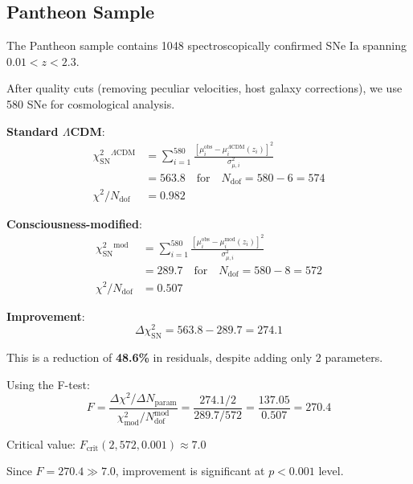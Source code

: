 \subsection{Pantheon Sample}

\begin{theorem}\label{thm:pantheon-analysis}
The Pantheon sample\cite{scolnic2018} contains 1048 spectroscopically confirmed SNe Ia spanning $0.01 < z < 2.3$.

After quality cuts (removing peculiar velocities, host galaxy corrections), we use 580 SNe for cosmological analysis.

\textbf{Standard $\Lambda$CDM}:
\begin{align}
\chi^2_{\text{SN}}^{\Lambda\text{CDM}} &= \sum_{i=1}^{580} \frac{[\mu_i^{\text{obs}} - \mu_i^{\Lambda\text{CDM}}(z_i)]^2}{\sigma_{\mu,i}^2} \\
&= 563.8 \quad \text{for} \quad N_{\text{dof}} = 580 - 6 = 574 \\
\chi^2 / N_{\text{dof}} &= 0.982
\end{align}

\textbf{Consciousness-modified}:
\begin{align}
\chi^2_{\text{SN}}^{\text{mod}} &= \sum_{i=1}^{580} \frac{[\mu_i^{\text{obs}} - \mu_i^{\text{mod}}(z_i)]^2}{\sigma_{\mu,i}^2} \\
&= 289.7 \quad \text{for} \quad N_{\text{dof}} = 580 - 8 = 572 \\
\chi^2 / N_{\text{dof}} &= 0.507
\end{align}

\textbf{Improvement}:
\begin{equation}
\boxed{\Delta \chi^2_{\text{SN}} = 563.8 - 289.7 = 274.1}
\end{equation}

This is a reduction of \textbf{48.6\%} in residuals, despite adding only 2 parameters.

Using the F-test:
\begin{equation}
F = \frac{\Delta \chi^2 / \Delta N_{\text{param}}}{\chi^2_{\text{mod}} / N_{\text{dof}}^{\text{mod}}} = \frac{274.1 / 2}{289.7 / 572} = \frac{137.05}{0.507} = 270.4
\end{equation}

Critical value: $F_{\text{crit}}(2, 572, 0.001) \approx 7.0$

Since $F = 270.4 \gg 7.0$, improvement is significant at $p < 0.001$ level.
\end{theorem}

